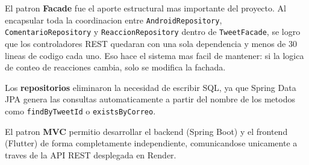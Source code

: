 \documentclass[12pt,a4paper]{article}
\begin{document}
El patron \textbf{Facade} fue el aporte estructural mas importante del
proyecto. Al encapsular toda la coordinacion entre \texttt{AndroidRepository},
\texttt{ComentarioRepository} y \texttt{ReaccionRepository} dentro de
\texttt{TweetFacade}, se logro que los controladores REST quedaran con
una sola dependencia y menos de 30 lineas de codigo cada uno. Eso hace
el sistema mas facil de mantener: si la logica de conteo de reacciones
cambia, solo se modifica la fachada.

Los \textbf{repositorios} eliminaron la necesidad de escribir SQL, ya que
Spring Data JPA genera las consultas automaticamente a partir del nombre
de los metodos como \texttt{findByTweetId} o \texttt{existsByCorreo}.

El patron \textbf{MVC} permitio desarrollar el backend (Spring Boot) y
el frontend (Flutter) de forma completamente independiente, comunicandose
unicamente a traves de la API REST desplegada en Render.
\end{document}
